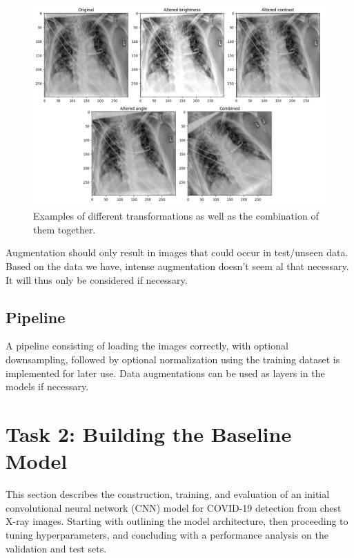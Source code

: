 \documentclass[conference]{IEEEtran}
\begin{document}
\begin{figure}[htbp]
\centerline{\includegraphics[width=\linewidth]{Images/augmentation.png}}
\caption{Examples of different transformations as well as the combination of them together.}
\label{fig:augmentation}
\end{figure}

Augmentation should only result in images that could occur in test/unseen data. Based on the data we have, intense augmentation doesn't seem al that necessary. It will thus only be considered if necessary.

\subsection{Pipeline}
A pipeline consisting of loading the images correctly, with optional downsampling, followed by optional normalization using the training dataset is implemented for later use. Data augmentations can be used as layers in the models if necessary.

\vspace{1cm}
\section{Task 2: Building the Baseline Model}\label{sec:task_2}
This section describes the construction, training, and evaluation of an initial convolutional neural network (CNN) model for COVID-19 detection from chest X-ray images. Starting with outlining the model architecture, then proceeding to tuning hyperparameters, and concluding with a performance analysis on the validation and test sets.
\end{document}
